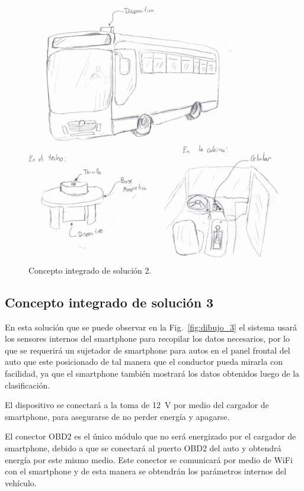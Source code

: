 \begin{figure}[htb!]
\centering
\includegraphics[width=\textwidth]{Dibujo_2.pdf}
\caption{Concepto integrado de solución 2.}
\label{fig:dibujo_2}
\end{figure}

\newpage
\subsection{Concepto integrado de solución 3}
En esta solución que se puede observar en la Fig.~\ref{fig:dibujo_3} el sistema usará los sensores internos del smartphone para recopilar los datos necesarios, por lo que se requerirá un sujetador de smartphone para autos en el panel frontal del auto que este posicionado de tal manera que el conductor pueda mirarla con facilidad, ya que el smartphone también mostrará los datos obtenidos luego de la clasificación.

El dispositivo se conectará a la toma de \SI{12}{V} por medio del cargador de smartphone, para asegurarse de no perder energía y apagarse.

El conector OBD2 es el único módulo que no será energizado por el cargador de smartphone, debido a que se conectará al puerto OBD2 del auto y obtendrá energía por este mismo medio. Este conector se comunicará por medio de WiFi con el smartphone y de esta manera se obtendrán los parámetros internos del vehículo.

